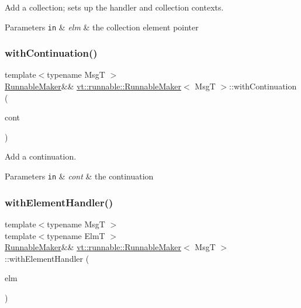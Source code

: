 Add a collection; sets up the handler and collection contexts. 


\begin{DoxyParams}[1]{Parameters}
\mbox{\tt in}  & {\em elm} & the collection element pointer \\
\hline
\end{DoxyParams}
\mbox{\label{structvt_1_1runnable_1_1_runnable_maker_aa547117a9c2e36d77f60712ec78eef58}} 
\subsubsection{\texorpdfstring{with\+Continuation()}{withContinuation()}}
{\footnotesize\ttfamily template$<$typename MsgT $>$ \\
\hyperlink{structvt_1_1runnable_1_1_runnable_maker}{Runnable\+Maker}\&\& \hyperlink{structvt_1_1runnable_1_1_runnable_maker}{vt\+::runnable\+::\+Runnable\+Maker}$<$ MsgT $>$\+::with\+Continuation (\begin{DoxyParamCaption}\item[{\hyperlink{namespacevt_ae0a5a7b18cc99d7b732cb4d44f46b0f3}{Action\+Type}}]{cont }\end{DoxyParamCaption})\hspace{0.3cm}{\ttfamily [inline]}}



Add a continuation. 


\begin{DoxyParams}[1]{Parameters}
\mbox{\tt in}  & {\em cont} & the continuation \\
\hline
\end{DoxyParams}
\mbox{\label{structvt_1_1runnable_1_1_runnable_maker_a1b37afe7a5ab185c29e85e0d6ebbbc82}} 
\subsubsection{\texorpdfstring{with\+Element\+Handler()}{withElementHandler()}}
{\footnotesize\ttfamily template$<$typename MsgT $>$ \\
template$<$typename ElmT $>$ \\
\hyperlink{structvt_1_1runnable_1_1_runnable_maker}{Runnable\+Maker}\&\& \hyperlink{structvt_1_1runnable_1_1_runnable_maker}{vt\+::runnable\+::\+Runnable\+Maker}$<$ MsgT $>$\+::with\+Element\+Handler (\begin{DoxyParamCaption}\item[{ElmT $\ast$}]{elm }\end{DoxyParamCaption})\hspace{0.3cm}{\ttfamily [inline]}}



